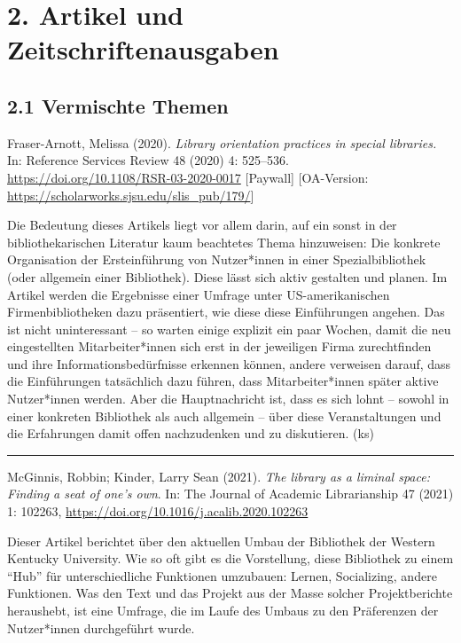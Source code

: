 \documentclass[a4paper,
fontsize=11pt,
oneside,
numbers=noperiodatend,
parskip=half-,
bibliography=totoc,
final
]{scrartcl}
\begin{document}
\hypertarget{artikel-und-zeitschriftenausgaben}{%
\section{2. Artikel und
Zeitschriftenausgaben}\label{artikel-und-zeitschriftenausgaben}}

\hypertarget{vermischte-themen}{%
\subsection{2.1 Vermischte Themen}\label{vermischte-themen}}

Fraser-Arnott, Melissa (2020). \emph{Library orientation practices in
special libraries.} In: Reference Services Review 48 (2020) 4: 525--536.
\url{https://doi.org/10.1108/RSR-03-2020-0017} {[}Paywall{]}
{[}OA-Version: \url{https://scholarworks.sjsu.edu/slis_pub/179/}{]}

Die Bedeutung dieses Artikels liegt vor allem darin, auf ein sonst in
der bibliothekarischen Literatur kaum beachtetes Thema hinzuweisen: Die
konkrete Organisation der Ersteinführung von Nutzer*innen in einer
Spezialbibliothek (oder allgemein einer Bibliothek). Diese lässt sich
aktiv gestalten und planen. Im Artikel werden die Ergebnisse einer
Umfrage unter US-amerikanischen Firmenbibliotheken dazu präsentiert, wie
diese diese Einführungen angehen. Das ist nicht uninteressant -- so
warten einige explizit ein paar Wochen, damit die neu eingestellten
Mitarbeiter*innen sich erst in der jeweiligen Firma zurechtfinden und
ihre Informationsbedürfnisse erkennen können, andere verweisen darauf,
dass die Einführungen tatsächlich dazu führen, dass Mitarbeiter*innen
später aktive Nutzer*innen werden. Aber die Hauptnachricht ist, dass es
sich lohnt -- sowohl in einer konkreten Bibliothek als auch allgemein --
über diese Veranstaltungen und die Erfahrungen damit offen nachzudenken
und zu diskutieren. (ks)

\begin{center}\rule{0.5\linewidth}{0.5pt}\end{center}

McGinnis, Robbin; Kinder, Larry Sean (2021). \emph{The library as a
liminal space: Finding a seat of one's own}. In: The Journal of Academic
Librarianship 47 (2021) 1: 102263,
\url{https://doi.org/10.1016/j.acalib.2020.102263}

Dieser Artikel berichtet über den aktuellen Umbau der Bibliothek der
Western Kentucky University. Wie so oft gibt es die Vorstellung, diese
Bibliothek zu einem \enquote{Hub} für unterschiedliche Funktionen
umzubauen: Lernen, Socializing, andere Funktionen. Was den Text und das
Projekt aus der Masse solcher Projektberichte heraushebt, ist eine
Umfrage, die im Laufe des Umbaus zu den Präferenzen der Nutzer*innen
durchgeführt wurde.
\end{document}
